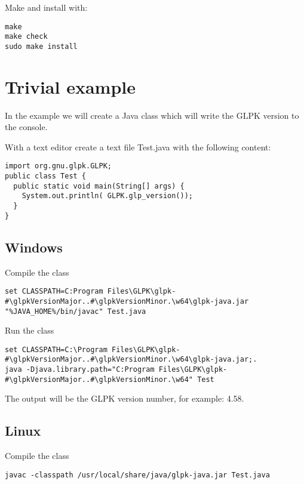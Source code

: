 \documentclass[a4paper,11pt]{report}
\newcommand{\glpkVersionMajor}{4}
\newcommand{\glpkVersionMinor}{58}
\begin{document}
Make and install with:

\begin{lstlisting}
make
make check
sudo make install
\end{lstlisting}

\section{Trivial example}

In the example we will create a Java class which will write the GLPK version to the console.

With a text editor create a text file Test.java with the following content:

\begin{lstlisting}
import org.gnu.glpk.GLPK;
public class Test {
  public static void main(String[] args) {
    System.out.println( GLPK.glp_version());
  }
}
\end{lstlisting}

\subsection{Windows}

Compile the class

\begin{lstlisting}
set CLASSPATH=C:Program Files\GLPK\glpk-#\glpkVersionMajor..#\glpkVersionMinor.\w64\glpk-java.jar
"%JAVA_HOME%/bin/javac" Test.java
\end{lstlisting}

Run the class

\begin{lstlisting}
set CLASSPATH=C:\Program Files\GLPK\glpk-#\glpkVersionMajor..#\glpkVersionMinor.\w64\glpk-java.jar;.
java -Djava.library.path="C:Program Files\GLPK\glpk-#\glpkVersionMajor..#\glpkVersionMinor.\w64" Test
\end{lstlisting}

The output will be the GLPK version number, for example: \glpkVersionMajor.\glpkVersionMinor.

\subsection{Linux}
Compile the class

\begin{lstlisting}
javac -classpath /usr/local/share/java/glpk-java.jar Test.java
\end{lstlisting}
\end{document}
